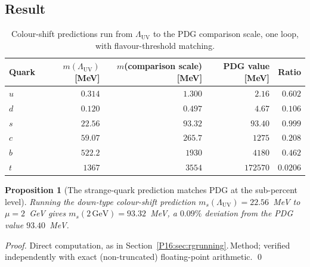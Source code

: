 \documentclass[11pt,a4paper]{article}
\newtheorem{proposition}[theorem]{Proposition}
\theoremstyle{definition}\newtheorem{definition}[theorem]{Definition}
\theoremstyle{remark}
\theoremstyle{definition}\newtheorem{construction}[theorem]{Construction}
\newcommand{\LUV}{\Lambda_{\mathrm{UV}}}
\begin{document}
\subsection{Result}

\begin{table}[h]
\centering
\begin{tabular}{lrrrr}
\toprule
Quark & $m(\LUV)$ [MeV] & $m$(comparison scale) [MeV] & PDG value [MeV] & Ratio \\
\midrule
$u$ & $0.314$   & $1.300$    & $2.16$      & $0.602$ \\
$d$ & $0.120$   & $0.497$    & $4.67$      & $0.106$ \\
$s$ & $22.56$   & $93.32$    & $93.40$     & $\mathbf{0.999}$ \\
$c$ & $59.07$   & $265.7$    & $1275$      & $0.208$ \\
$b$ & $522.2$   & $1930$     & $4180$      & $0.462$ \\
$t$ & $1367$    & $3554$     & $172570$    & $0.0206$ \\
\bottomrule
\end{tabular}
\caption{Colour-shift predictions run from $\LUV$ to the PDG
  comparison scale, one loop, with flavour-threshold matching.}
\label{P16:tab:rg_running}
\end{table}

\begin{proposition}[The strange-quark prediction matches PDG at the
  sub-percent level]
\label{P16:prop:strange_match}
Running the down-type colour-shift prediction $m_s(\LUV)=22.56$~MeV
to $\mu=2$~GeV gives $m_s(2\,\mathrm{GeV})=93.32$~MeV, a $0.09\%$
deviation from the PDG value $93.40$~MeV.
\end{proposition}

\begin{proof}
Direct computation, as in Section~\ref{P16:sec:rgrunning}.\,Method;
verified independently with exact (non-truncated) floating-point
arithmetic.
\qed
\end{proof}
\end{document}
